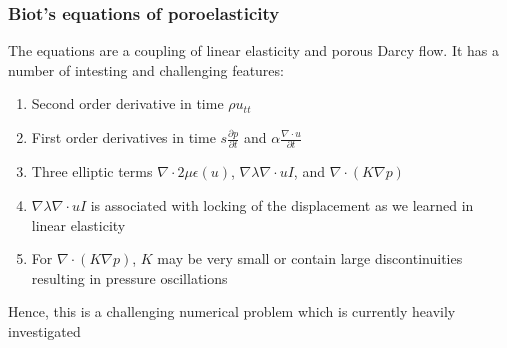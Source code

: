 \begin{frame}
\frametitle{Biot's equations of poroelasticity} 
The equations are a coupling of linear elasticity 
and porous Darcy flow. It has a number of
intesting and challenging features: 
\begin{enumerate}
\item Second order derivative in time  
$\rho u_{tt}$ 
\item First order derivatives in time 
$ s \frac{\partial p}{\partial t}$ and $ \alpha \frac{\nabla \cdot u}{\partial t}$
\item Three elliptic terms 
$\nabla\cdot 2 \mu \epsilon(u)$, $\nabla \lambda \nabla \cdot u I$, and  $\nabla \cdot (K \nabla p)$ 
\item 
$\nabla \lambda \nabla \cdot u I$ is associated with locking of the displacement as we learned 
in linear elasticity  
\item For $\nabla \cdot (K \nabla p)$, $K$ may be very small or contain large discontinuities resulting in
pressure oscillations  
\end{enumerate}
Hence, this is a challenging numerical problem which is currently heavily investigated
\end{frame}
